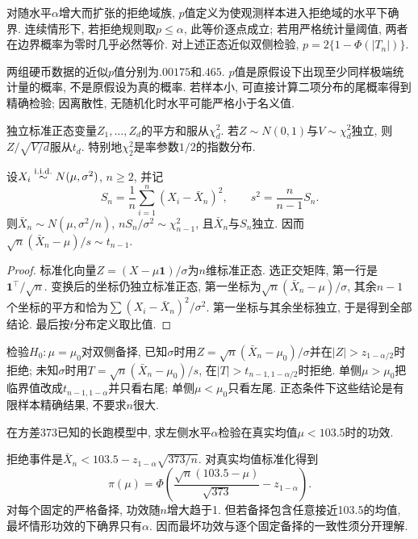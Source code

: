 \begin{definition}[$p$值]
对随水平$\alpha$增大而扩张的拒绝域族, $p$值定义为使观测样本进入拒绝域的水平下确界. 连续情形下, 若拒绝规则取$p\leq\alpha$, 此等价逐点成立; 若用严格统计量阈值, 两者在边界概率为零时几乎必然等价. 对上述正态近似双侧检验, $p=2\{1-\Phi(|T_n|)\}$.
\end{definition}
两组硬币数据的近似$p$值分别为$.00175$和$.465$. $p$值是原假设下出现至少同样极端统计量的概率, 不是原假设为真的概率. 若样本小, 可直接计算二项分布的尾概率得到精确检验; 因离散性, 无随机化时水平可能严格小于名义值.

\begin{definition}
独立标准正态变量$Z_1,\ldots,Z_d$的平方和服从$\chi_d^2$. 若$Z\sim N(0,1)$与$V\sim\chi_d^2$独立, 则$Z/\sqrt{V/d}$服从$t_d$. 特别地$\chi_2^2$是率参数$1/2$的指数分布.
\end{definition}
\begin{theorem}[正态样本的正交分解]
设$X_i\stackrel{\mathrm{i.i.d.}}{\sim} N(\mu,\sigma^2)$, $n\geq2$, 并记
\[
 S_n=\frac1n\sum_{i=1}^n(X_i-\bar X_n)^2,\qquad s^2=\frac{n}{n-1}S_n.
\]
则$\bar X_n\sim N(\mu,\sigma^2/n)$, $nS_n/\sigma^2\sim\chi_{n-1}^2$, 且$\bar X_n$与$S_n$独立. 因而$\sqrt n(\bar X_n-\mu)/s\sim t_{n-1}$.
\end{theorem}
\begin{proof}
标准化向量$Z=(X-\mu\boldsymbol1)/\sigma$为$n$维标准正态. 选正交矩阵, 第一行是$\boldsymbol1^\top/\sqrt n$. 变换后的坐标仍独立标准正态, 第一坐标为$\sqrt n(\bar X_n-\mu)/\sigma$, 其余$n-1$个坐标的平方和恰为$\sum(X_i-\bar X_n)^2/\sigma^2$. 第一坐标与其余坐标独立, 于是得到全部结论. 最后按$t$分布定义取比值.
\end{proof}
检验$H_0:\mu=\mu_0$对双侧备择, 已知$\sigma$时用$Z=\sqrt n(\bar X_n-\mu_0)/\sigma$并在$|Z|>z_{1-\alpha/2}$时拒绝; 未知$\sigma$时用$T=\sqrt n(\bar X_n-\mu_0)/s$, 在$|T|>t_{n-1,1-\alpha/2}$时拒绝. 单侧$\mu>\mu_0$把临界值改成$t_{n-1,1-\alpha}$并只看右尾; 单侧$\mu<\mu_0$只看左尾. 正态条件下这些结论是有限样本精确结果, 不要求$n$很大.

\begin{example}
在方差373已知的长跑模型中, 求左侧水平$\alpha$检验在真实均值$\mu<103.5$时的功效.
\end{example}
\begin{solution}
拒绝事件是$\bar X_n<103.5-z_{1-\alpha}\sqrt{373/n}$. 对真实均值标准化得到
\[
 \pi(\mu)=\Phi\left(\frac{\sqrt n(103.5-\mu)}{\sqrt{373}}-z_{1-\alpha}\right).
\]
对每个固定的严格备择, 功效随$n$增大趋于1. 但若备择包含任意接近103.5的均值, 最坏情形功效的下确界只有$\alpha$. 因而最坏功效与逐个固定备择的一致性须分开理解.
\end{solution}

